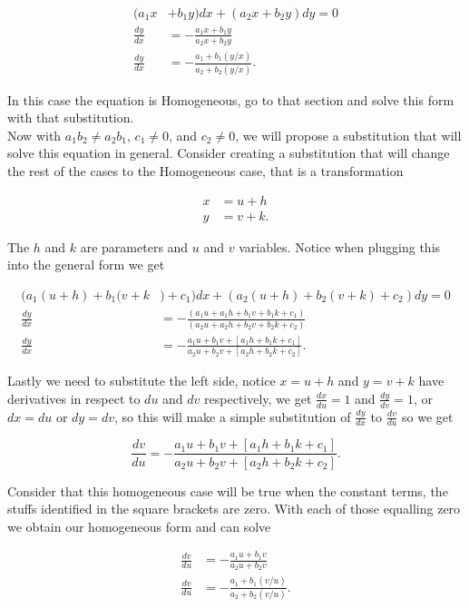 \documentclass[12pt]{article}
\begin{document}
\begin{align*}
    (a_1x&+b_1y)dx+(a_2x+b_2y)dy = 0 \\
    \frac{dy}{dx} &= -\frac{a_1x+b_1y}{a_2x+b_2y} \\
    \frac{dy}{dx} &= -\frac{a_1+b_1(y/x)}{a_2+b_2(y/x)}.
\end{align*}

In this case the equation is Homogeneous, go to that section and solve this form with that substitution. \\

Now with $a_1b_2 \neq a_2b_1$, $c_1 \neq 0$, and $c_2 \neq 0$, we will propose a substitution that will solve this equation in general. Consider creating a substitution that will change the rest of the cases to the Homogeneous case, that is a transformation

\begin{align*}
    x&=u+h \\
    y&=v+k.
\end{align*}

The $h$ and $k$ are parameters and $u$ and $v$ variables. Notice when plugging this into the general form we get

\begin{align*}
    (a_1(u+h)+b_1(v+k&)+c_1)dx+(a_2(u+h)+b_2(v+k)+c_2)dy=0 \\
    \frac{dy}{dx} &=-\frac{(a_1u+a_1h+b_1v+b_1k+c_1)}{(a_2u+a_2h+b_2v+b_2k+c_2)} \\
    \frac{dy}{dx} &=-\frac{a_1u+b_1v+[a_1h+b_1k+c_1]}{a_2u+b_2v+[a_2h+b_2k+c_2]}.
\end{align*}

Lastly we need to substitute the left side, notice $x=u+h$ and $y=v+k$ have derivatives in respect to $du$ and $dv$ respectively, we get $\frac{dx}{du}=1$ and $\frac{dy}{dv}=1$, or $dx=du$ or $dy=dv$, so this will make a simple substitution of $\frac{dy}{dx}$ to $\frac{dv}{du}$ so we get

\begin{equation*}
    \frac{dv}{du} =-\frac{a_1u+b_1v+[a_1h+b_1k+c_1]}{a_2u+b_2v+[a_2h+b_2k+c_2]}.
\end{equation*}

Consider that this homogeneous case will be true when the constant terms, the stuffs identified in the square brackets are zero. With each of those equalling zero we obtain our homogeneous form and can solve

\begin{align*}
    \frac{dv}{du} &=-\frac{a_1u+b_1v}{a_2u+b_2v} \\
    \frac{dv}{du} &=-\frac{a_1+b_1(v/u)}{a_2+b_2(v/u)}.
\end{align*}
\end{document}
